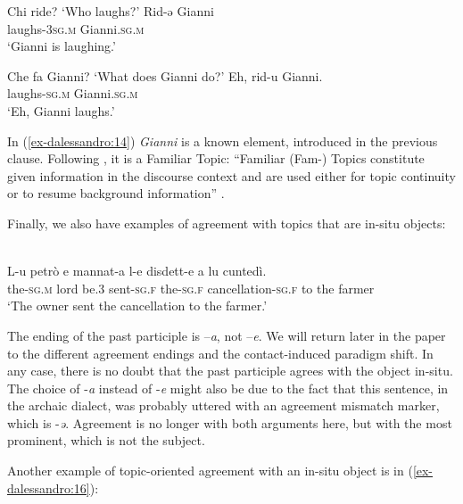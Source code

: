 \documentclass[output=paper
,modfonts
,nonflat]{langsci/langscibook}
\begin{document}
\begin{exe} \settowidth{}
	\ex  \label{ex-dalessandro:13}\citet[9]{Paciaroni2017} \xlist
	\ex   Chi ride{?} 
	\glt `Who laughs{?}' 
	\ex
	\gll  Rid-ə     Gianni\\ 
	laughs-\textsc{3sg.m} Gianni.\textsc{sg.m}\\ 
	\glt `Gianni is laughing.'
	\endxlist
\end{exe}
\begin{exe} \settowidth{}
	\ex \label{ex-dalessandro:14} \citet[9]{Paciaroni2017} \xlist
	\ex   Che fa Gianni? 
	\glt `What does Gianni do?' 
	\ex
	\gll  Eh,   rid-u     Gianni.\\ 
	{ } laughs-\textsc{sg.m} Gianni.\textsc{sg.m}\\ 
	\glt `Eh, Gianni laughs.'
	\endxlist
\end{exe}
In (\ref{ex-dalessandro:14}) \textit{Gianni} is a known element, introduced in the previous clause. Following \citet{Frascarelli2012}, it is a Familiar Topic: “Familiar (Fam-) Topics constitute given information in the discourse context and are used either for topic continuity or to resume background information” \citep[181]{Frascarelli2012}. 

Finally, we also have examples of agreement with topics that are in-situ objects:

\begin{exe}
	\ex \label{ex-dalessandro:15}	\citet[93]{Rossi2008}\\
	\gll L-u     petrò e   mannat-a l-e   disdett-e a lu cuntedì.\\
	the-\textsc{sg.m}  lord  be.3  sent-\textsc{sg.f} the-\textsc{sg.f} cancellation-\textsc{sg.f} to the farmer\\
	\glt `The owner sent the cancellation to the farmer.'
\end{exe}
The ending of the past participle is –\textit{a}, not –\textit{e}. We will return later in the paper to the different agreement endings and the contact-induced paradigm shift. In any case, there is no doubt that the past participle agrees with the object in-situ. The choice of -\textit{a} instead of -\textit{e} might also be due to the fact that this sentence, in the archaic dialect, was probably uttered with an agreement mismatch marker, which is -\textit{ə}. Agreement is no longer with both arguments here, but with the most prominent, which is not the subject. 

Another example of topic-oriented agreement with an in-situ object is in (\ref{ex-dalessandro:16}):
\end{document}
